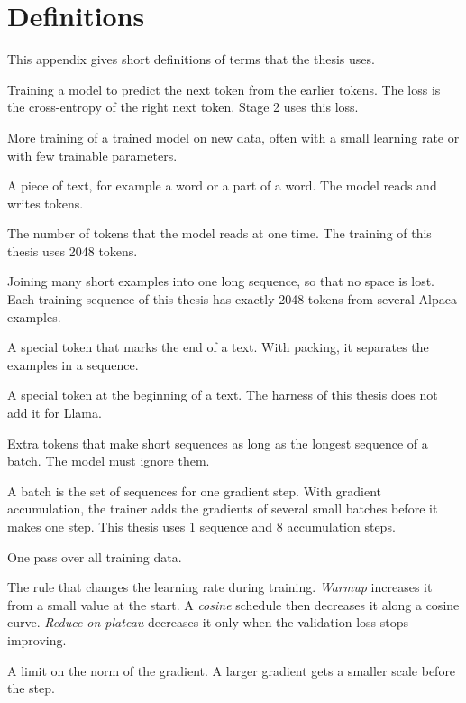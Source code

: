 \chapter{Definitions}
\label{app:definitions}

This appendix gives short definitions of terms that the thesis uses.

\begin{description}[leftmargin=0.6cm,style=nextline]
\item[Causal language modeling] Training a model to predict the next token from the earlier tokens. The loss is the cross-entropy of the right next token. Stage 2 uses this loss.
\item[Fine-tuning] More training of a trained model on new data, often with a small learning rate or with few trainable parameters.
\item[Token] A piece of text, for example a word or a part of a word. The model reads and writes tokens.
\item[Context size] The number of tokens that the model reads at one time. The training of this thesis uses 2048 tokens.
\item[Packing] Joining many short examples into one long sequence, so that no space is lost. Each training sequence of this thesis has exactly 2048 tokens from several Alpaca examples.
\item[EOS token] A special token that marks the end of a text. With packing, it separates the examples in a sequence.
\item[BOS token] A special token at the beginning of a text. The harness of this thesis does not add it for Llama.
\item[Padding] Extra tokens that make short sequences as long as the longest sequence of a batch. The model must ignore them.
\item[Batch and gradient accumulation] A batch is the set of sequences for one gradient step. With gradient accumulation, the trainer adds the gradients of several small batches before it makes one step. This thesis uses 1 sequence and 8 accumulation steps.
\item[Epoch] One pass over all training data.
\item[Learning rate schedule] The rule that changes the learning rate during training. \emph{Warmup} increases it from a small value at the start. A \emph{cosine} schedule then decreases it along a cosine curve. \emph{Reduce on plateau} decreases it only when the validation loss stops improving.
\item[Gradient clipping] A limit on the norm of the gradient. A larger gradient gets a smaller scale before the step.

\end{description}
